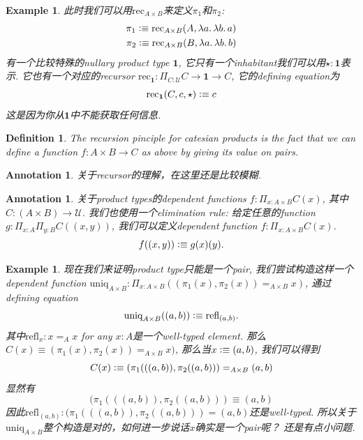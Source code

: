 \documentclass{article}
\newtheorem{example}[theorem]{Example}
\newtheorem{definition}[theorem]{Definition}
\newtheorem{annotation}[theorem]{Annotation}
\newcommand{\lam}[2]{\ensuremath{\lambda #1\ldotp #2}} %
\newcommand{\defeqv}{\vcentcolon\equiv}
\begin{document}
\begin{example}
\rm 此时我们可以用$\text{rec}_{A \times B}$来定义$\pi_1$和$\pi_2$:
\[
	\begin{aligned}
	\pi_1 \defeqv \text{rec}_{A \times B}(A, \lam{a}{\lam{b}{a}}) \\
	\pi_2 \defeqv \text{rec}_{A \times B}(B, \lam{a}{\lam{b}{b}})
	\end{aligned}
\]
有一个比较特殊的nullary product type $\mathbf{1}$, 它只有一个inhabitant我们可以用$\star:\mathbf{1}$表示. 它也有一个对应的recursor $\text{rec}_\mathbf{1}: \Pi_{C:\mathcal{U}} C \to \mathbf{1} \to C$, 它的defining equation为
\[
	\text{rec}_\mathbf{1}(C, c, \star) \defeqv c 
\]
这是因为你从$\mathbf{1}$中不能获取任何信息.
\end{example}

\begin{definition}
\rm The recursion pinciple for catesian products is the fact that we can define a function $f:A \times B \to C$ as above by giving its value on pairs.
\end{definition}

\begin{annotation}
\rm 关于recursor的理解，在这里还是比较模糊.
\end{annotation}

\begin{annotation}
\rm 关于product types的dependent functions $f: \Pi_{x:A\times B}C(x)$, 其中$C: (A \times B) \to \mathcal{U}$. 我们也使用一个elimination rule: 给定任意的function $g:\Pi_{x:A}\Pi_{y:B}C((x,y))$, 我们可以定义dependent function $f: \Pi_{x:A\times B}C(x)$.
\[
	f((x,y)) \defeqv g(x)(y).
\]
\end{annotation}

\begin{example}
\rm 现在我们来证明product type只能是一个pair, 我们尝试构造这样一个dependent function $\text{uniq}_{A \times B}:\Pi_{x:A \times B}((\pi_1(x),\pi_2(x)) =_{A \times B} x)$, 通过defining equation
\[
	\text{uniq}_{A \times B}((a,b)) \defeqv \text{refl}_{(a,b)}.
\]
其中$\text{refl}_{x}: x =_A x$ for any $x:A$是一个well-typed element. 那么$C(x) \equiv (\pi_1(x),\pi_2(x)) =_{A \times B} x)$, 那么当$x \defeqv (a,b)$, 我们可以得到
\[
	C(x) \defeqv (\pi_1(((a,b)),\pi_2((a,b))) =_{A \times B} (a,b)
\]
显然有
\[
	(\pi_1(((a,b)),\pi_2((a,b))) \equiv (a,b)
\]
因此$\text{refl}_{(a,b)}: (\pi_1(((a,b)),\pi_2((a,b))) = (a,b)$还是well-typed. 所以关于$\text{uniq}_{A \times B}$整个构造是对的，如何进一步说话$x$确实是一个pair呢？ 还是有点小问题.
\end{example}
\end{document}
